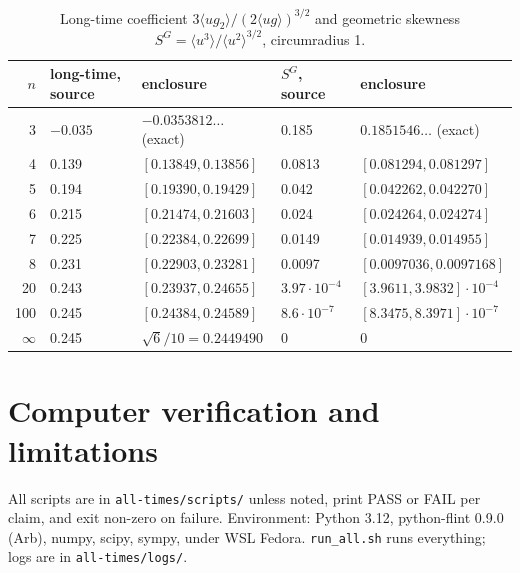 \documentclass[11pt,a4paper]{report}
\DeclareRobustCommand*{\avg}[1]{\langle #1\rangle}
\begin{document}
\begin{table}
\centering
\footnotesize
\setlength{\tabcolsep}{4pt}
\begin{tabular}{rllll}
\toprule
\(n\) & long-time, source & enclosure & \(S^G\), source & enclosure \\
\midrule
3 & \(-0.035\) & \(-0.0353812\dots\) (exact) & 0.185 & \(0.1851546\dots\) (exact)\\
4 & 0.139 & \([0.13849,0.13856]\) & 0.0813 & \([0.081294,0.081297]\)\\
5 & 0.194 & \([0.19390,0.19429]\) & 0.042 & \([0.042262,0.042270]\)\\
6 & 0.215 & \([0.21474,0.21603]\) & 0.024 & \([0.024264,0.024274]\)\\
7 & 0.225 & \([0.22384,0.22699]\) & 0.0149 & \([0.014939,0.014955]\)\\
8 & 0.231 & \([0.22903,0.23281]\) & 0.0097 & \([0.0097036,0.0097168]\)\\
20 & 0.243 & \([0.23937,0.24655]\) & \(3.97\cdot10^{-4}\) & \([3.9611,3.9832]\cdot10^{-4}\)\\
100 & 0.245 & \([0.24384,0.24589]\) & \(8.6\cdot10^{-7}\) & \([8.3475,8.3971]\cdot10^{-7}\)\\
\(\infty\) & 0.245 & \(\sqrt6/10=0.2449490\) & 0 & 0\\
\bottomrule
\end{tabular}
\caption{Long-time coefficient \(3\avg{ug_2}/(2\avg{ug})^{3/2}\) and geometric skewness \(S^G=\avg{u^3}/\avg{u^2}^{3/2}\), circumradius 1.}
\label{tab:source}
\end{table}

\section{Computer verification and limitations}\label{sec:computer}

All scripts are in \texttt{all-times/scripts/} unless noted, print PASS or FAIL per claim, and exit non-zero on failure.
Environment: Python 3.12, python-flint 0.9.0 (Arb), numpy, scipy, sympy, under WSL Fedora. \texttt{run\_all.sh} runs everything; logs are in \texttt{all-times/logs/}.
\end{document}
